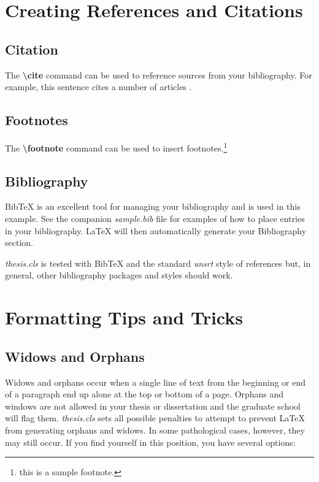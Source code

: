 \documentclass[master]{thesis}
\begin{document}
\chapter{Creating References and Citations}
\label{chap:references}

\section{Citation}

The \textbf{\textbackslash cite} command can be used to reference sources from your bibliography.  For example, this sentence cites a number of articles \cite{forney2011classify, cebl, forney2011thesis, forney2015echostate, haykin2009neural}.

\section{Footnotes}

The \textbf{\textbackslash footnote} command can be used to insert footnotes.\footnote{this is a sample footnote.}

\section{Bibliography}

BibTeX is an excellent tool for managing your bibliography and is used in this example.  See the companion \textit{sample.bib} file for examples of how to place entries in your bibliography.  \LaTeX{} will then automatically generate your Bibliography section.

\textit{thesis.cls} is tested with BibTeX and the standard \textit{unsrt} style of references but, in general, other bibliography packages and styles should work.

\chapter{Formatting Tips and Tricks}
\label{chap:tips.and.tricks}

\section{Widows and Orphans}

Widows and orphans occur when a single line of text from the beginning or end of a paragraph end up alone at the top or bottom of a page.  Orphans and windows are not allowed in your thesis or dissertation and the graduate school will flag them.  \textit{thesis.cls} sets all possible penalties to attempt to prevent \LaTeX{} from generating orphans and widows.  In some pathological cases, however, they may still occur.  If you find yourself in this position, you have several options:
\end{document}
